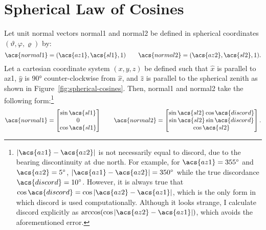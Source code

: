 \chapter{Spherical Law of Cosines}\label{app:spherical-cosines}
Let unit normal vectors \acs{normal1} and \acs{normal2} be defined in spherical coordinates $(\vartheta,\varphi,\varrho)$ by:
\begin{equation}
    \acs{normal1}=(\acs{az1},\acs{sl1},1)\qquad\acs{normal2}=(\acs{az2},\acs{sl2},1).
\end{equation}
Let a cartesian coordinate system $(x,y,z)$ be defined such that $\hat x$ is parallel to \acs{az1}, $\hat y$ is \ang{90} counter-clockwise from $\hat x$, and $\hat z$ is parallel to the spherical zenith as shown in Figure~\ref{fig:spherical-cosines}. Then, \acs{normal1} and \acs{normal2} take the following form:\footnote{$|\acs{az1}-\acs{az2}|$ is not necessarily equal to \acs{discord}, due to the bearing discontinuity at due north. For example, for $\acs{az1}=\ang{355}$ and $\acs{az2}=\ang{5}$, $|\acs{az1}-\acs{az2}|=\ang{350}$ while the true discordance $\acs{discord}=\ang{10}$. However, it is always true that $\cos\acs{discord}=\cos|\acs{az2}-\acs{az1}|$, which is the only form in which \acs{discord} is used computationally. Although it looks strange, I calculate \acs{discord} explicitly as $\arccos(\cos|\acs{az2}-\acs{az1}|)$, which avoids the aforementioned error.}
\begin{equation}
    \acs{normal1}=
    \begin{bmatrix}
        \sin\acs{sl1}\\
        0\\
        \cos\acs{sl1}
    \end{bmatrix}
    \qquad
    \acs{normal2}=
    \begin{bmatrix}
        \sin\acs{sl2}\cos\acs{discord}\\
        \sin\acs{sl2}\sin\acs{discord}\\
        \cos\acs{sl2}
    \end{bmatrix}.
\end{equation}

